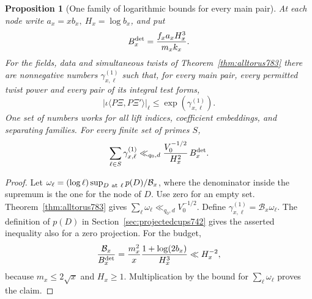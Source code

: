 \documentclass[a4paper,11pt]{article}
\newtheorem{proposition}{Proposition}[section]
\theoremstyle{definition}
\theoremstyle{remark}
\numberwithin{equation}{section}
\begin{document}
\begin{proposition}[One family of logarithmic bounds for every main pair]
\leavevmode\label{prop:torusbudget784}
At each node write \(a_x=xb_x,\ H_x=\log b_x\), and put
\[
       B_x^{\rm det}=\frac{f_x a_x H_x^3}{m_x k_x}.
\]
For the fields, data and simultaneous twists of
Theorem~\ref{thm:alltorus783} there are nonnegative
numbers \(\gamma^{(1)}_{x,\ell}\) such that, for every
main pair, every permitted twist power and every pair
of its integral test forms,
\[
     |\iota\langle P\Xi,P\Xi'\rangle|_\ell
                     \le \exp(\gamma^{(1)}_{x,\ell}).
\]
One set of numbers works for all lift indices,
coefficient embeddings, and separating families. For
every finite set of primes \(S\),
\[
  \sum_{\ell\in S}\gamma^{(1)}_{x,\ell}
   \ll_{q_0,d} \frac{V_0^{-1/2}}{H_x^2}\,B_x^{\rm det}.
\]
\end{proposition}
\begin{proof}
Let \(\omega_\ell=(\log\ell)\sup_{D\ {\rm at}\ \ell}
p(D)/\mathcal B_x\), where the denominator inside the
supremum is the one for the node of \(D\). Use zero for
an empty set. Theorem~\ref{thm:alltorus783} gives
\(\sum_\ell\omega_\ell\ll_{q_0,d}V_0^{-1/2}\). Define
\(\gamma^{(1)}_{x,\ell}=\mathcal B_x\omega_\ell\).
The definition of \(p(D)\) in
Section~\ref{sec:projectedcups742} gives the asserted
inequality also for a zero projection. For the budget,
\[
  \frac{\mathcal B_x}{B_x^{\rm det}}
      =\frac{m_x^2}{x}\frac{1+\log(2b_x)}{H_x^3}
      \ll H_x^{-2},
\]
because \(m_x\le2\sqrt{x}\) and \(H_x\ge1\).
Multiplication by the bound for \(\sum_\ell\omega_\ell\)
proves the claim.
\end{proof}
\end{document}
